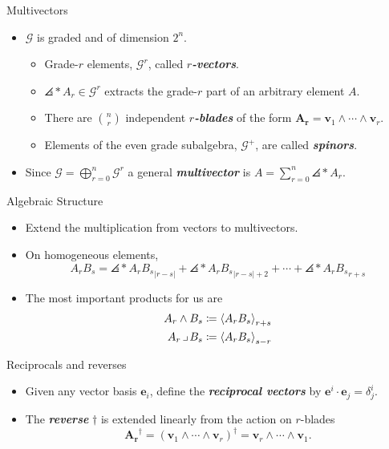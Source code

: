 \documentclass[aspectratio=169]{beamer}
\newcommand\boldgreen[1]{\textcolor{lighter_csu_green}{\emph{\textbf{#1}}}}
\newcommand{\G}{\mathcal{G}}
\newcommand{\blade}[1]{\boldsymbol{#1}}
\newcommand{\contract}{\hspace*{.5mm} \lrcorner \hspace*{.5mm}}
\DeclarePairedDelimiter\angles{\langle}{\rangle}
\newcommand{\proj}[2]{\angles*{#2}_{#1}}
\begin{document}
\begin{frame}{Multivectors}
\vfill
\begin{itemize}
    \pause
        \item $\G$ is graded and of dimension $2^n$.
    \begin{itemize}
        \pause
        \item Grade-$r$ elements, $\G^r$, called \boldgreen{$r$-vectors}.
        \pause
        \item $\proj{r}{A}\in \G^r$ extracts the grade-$r$ part of an arbitrary element $A$.
        \pause
        \item There are ${n \choose r}$ independent \boldgreen{$r$-blades} of the form $\blade{A_r}=\blade{v}_1 \wedge \cdots \wedge\blade{v}_r$.
        \pause
        \item Elements of the even grade subalgebra, $\G^+$, are called \boldgreen{spinors}.
    \end{itemize}
        \pause
        \item Since $\displaystyle{\G=\bigoplus_{r=0}^n \G^r}$ a general \boldgreen{multivector} is $\displaystyle{A = \sum_{r=0}^n \proj{r}{A}}$.
\end{itemize}
\vfill
\end{frame}

\begin{frame}{Algebraic Structure}
\vfill
\begin{itemize}
\pause
\item Extend the multiplication from vectors to multivectors.
\pause
\item On homogeneous elements,
\[
A_r B_s = \proj{|r-s|}{A_r B_s} + \proj{|r-s|+2}{A_r B_s} + \cdots + \proj{r+s}{A_r B_s}
\]
\pause
\item The most important products for us are
\begin{align*}
A_r \wedge B_s &\coloneqq \proj{r+s}{A_r B_s}\\
{A_r} \contract B_s &\coloneqq \proj{s-r}{A_r B_s}
\end{align*}
\end{itemize}
\vfill
\end{frame}

\begin{frame}{Reciprocals and reverses}
\vfill
\begin{itemize}
\pause
\item Given any vector basis $\blade{e}_i$, define the \boldgreen{reciprocal vectors} by $\blade{e}^i\cdot \blade{e}_j = \delta^i_j$.
\pause
\item The \boldgreen{reverse} $\dagger$ is extended linearly from the action on $r$-blades
\[
\blade{A_r}^\dagger = (\blade{v}_1 \wedge \cdots \wedge\blade{v}_r)^\dagger = \blade{v}_r \wedge \cdots \wedge\blade{v}_1.
\]
\end{itemize}
\vfill
\end{frame}
\end{document}
